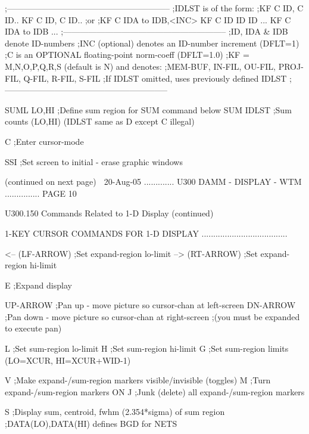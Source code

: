                   ;-----------------------------------------------------------
                  ;IDLST is of the form:
                  ;KF C ID, C ID.. KF C ID, C ID..
                  ;or
                  ;KF C IDA to IDB,<INC> KF C ID ID ID ... KF C IDA to IDB ...
                  ;-----------------------------------------------------------
                  ;ID, IDA & IDB denote ID-numbers
                  ;INC (optional) denotes an ID-number increment (DFLT=1)
                  ;C is an OPTIONAL floating-point norm-coeff (DFLT=1.0)
                  ;KF = M,N,O,P,Q,R,S (default is N) and denotes:
                  ;MEM-BUF, IN-FIL, OU-FIL, PROJ-FIL, Q-FIL, R-FIL, S-FIL
                  ;If IDLST omitted, uses previously defined IDLST
                  ;-----------------------------------------------------------
 
   SUML LO,HI     ;Define sum region for SUM command below
   SUM  IDLST     ;Sum counts (LO,HI) (IDLST same as D except C illegal)
 
   C              ;Enter cursor-mode
 
   SSI            ;Set screen to initial - erase graphic windows
 
                            (continued on next page)
    
   20-Aug-05 ............. U300  DAMM - DISPLAY - WTM ............... PAGE  10
 
 
   U300.150  Commands Related to 1-D Display (continued)
 
 
   1-KEY CURSOR COMMANDS FOR 1-D DISPLAY .....................................
 
   <-- (LF-ARROW) ;Set expand-region lo-limit
   --> (RT-ARROW) ;Set expand-region hi-limit
 
   E              ;Expand display
 
   UP-ARROW       ;Pan up   - move picture so cursor-chan at  left-screen
   DN-ARROW       ;Pan down - move picture so cursor-chan at right-screen
                  ;(you must be expanded to execute pan)
 
   L              ;Set sum-region lo-limit
   H              ;Set sum-region hi-limit
   G              ;Set sum-region limits (LO=XCUR, HI=XCUR+WID-1)
 
   V              ;Make expand-/sum-region markers visible/invisible (toggles)
   M              ;Turn expand-/sum-region markers ON
   J              ;Junk (delete) all expand-/sum-region markers
 
   S              ;Display sum, centroid, fwhm (2.354*sigma) of sum region
                  ;DATA(LO),DATA(HI) defines BGD for NETS
 
